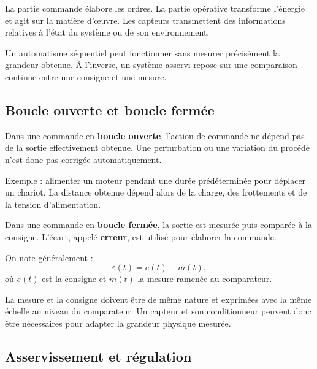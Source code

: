 La partie commande élabore les ordres. La partie opérative transforme l'énergie et agit sur la matière d'œuvre. Les capteurs transmettent des informations relatives à l'état du système ou de son environnement.

\SAChaineFonctionnelle

Un automatisme séquentiel peut fonctionner sans mesurer précisément la grandeur obtenue. À l'inverse, un système asservi repose sur une comparaison continue entre une consigne et une mesure.

\subsection{Boucle ouverte et boucle fermée}

\begin{SAdefinition}[title={Commande en boucle ouverte}]
Dans une commande en \textbf{boucle ouverte}, l'action de commande ne dépend pas de la sortie effectivement obtenue. Une perturbation ou une variation du procédé n'est donc pas corrigée automatiquement.
\end{SAdefinition}

Exemple : alimenter un moteur pendant une durée prédéterminée pour déplacer un chariot. La distance obtenue dépend alors de la charge, des frottements et de la tension d'alimentation.

\begin{SAdefinition}[title={Commande en boucle fermée}]
Dans une commande en \textbf{boucle fermée}, la sortie est mesurée puis comparée à la consigne. L'écart, appelé \textbf{erreur}, est utilisé pour élaborer la commande.
\end{SAdefinition}

\SASchemaBoucleGenerale

On note généralement :
\[
\varepsilon(t)=e(t)-m(t),
\]
où $e(t)$ est la consigne et $m(t)$ la mesure ramenée au comparateur.

\begin{SAattention}
La mesure et la consigne doivent être de même nature et exprimées avec la même échelle au niveau du comparateur. Un capteur et son conditionneur peuvent donc être nécessaires pour adapter la grandeur physique mesurée.
\end{SAattention}

\subsection{Asservissement et régulation}


